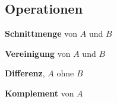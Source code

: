 \subsection{Operationen}

\begin{description}[style=nextline]
	\item[\(A \cap B\)]
	\textbf{Schnittmenge} von \(A\) und \(B\)
	\item[\(A \cup B\)]
	\textbf{Vereinigung} von \(A\) und \(B\)
	\item[\(A \setminus B\)]
	\textbf{Differenz}, \(A\) ohne \(B\)
	\item[\(\bar{A}\)]
	\textbf{Komplement} von \(A\)
\end{description}
